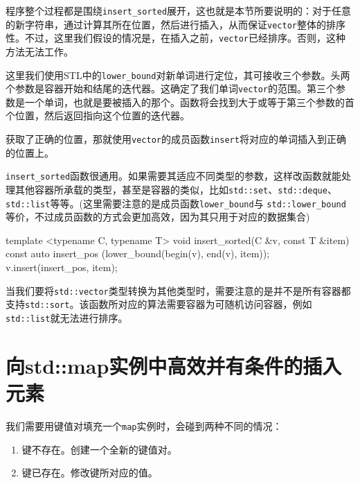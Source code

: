 
程序整个过程都是围绕\texttt{insert\_sorted}展开，这也就是本节所要说明的：对于任意的新字符串，通过计算其所在位置，然后进行插入，从而保证\texttt{vector}整体的排序性。不过，这里我们假设的情况是，在插入之前，\texttt{vector}已经排序。否则，这种方法无法工作。

这里我们使用STL中的\texttt{lower\_bound}对新单词进行定位，其可接收三个参数。头两个参数是容器开始和结尾的迭代器。这确定了我们单词\texttt{vector}的范围。第三个参数是一个单词，也就是要被插入的那个。函数将会找到大于或等于第三个参数的首个位置，然后返回指向这个位置的迭代器。

获取了正确的位置，那就使用\texttt{vector}的成员函数\texttt{insert}将对应的单词插入到正确的位置上。


\texttt{insert\_sorted}函数很通用。如果需要其适应不同类型的参数，这样改函数就能处理其他容器所承载的类型，甚至是容器的类似，比如\texttt{std::set}、\texttt{std::deque}、\texttt{std::list}等等。(这里需要注意的是成员函数\texttt{lower\_bound}与 \texttt{std::lower\_bound}等价，不过成员函数的方式会更加高效，因为其只用于对应的数据集合)

\begin{codebox}[cpp]
template <typename C, typename T>
void insert_sorted(C &v, const T &item)
{
    const auto insert_pos (lower_bound(begin(v), end(v), item));
    v.insert(insert_pos, item);
}
\end{codebox}

当我们要将\texttt{std::vector}类型转换为其他类型时，需要注意的是并不是所有容器都支持\texttt{std::sort}。该函数所对应的算法需要容器为可随机访问容器，例如\texttt{std::list}就无法进行排序。


\section{向std::map实例中高效并有条件的插入元素}

我们需要用键值对填充一个\texttt{map}实例时，会碰到两种不同的情况：

\begin{enumerate}
\item 键不存在。创建一个全新的键值对。

\item 键已存在。修改键所对应的值。

\end{enumerate}

